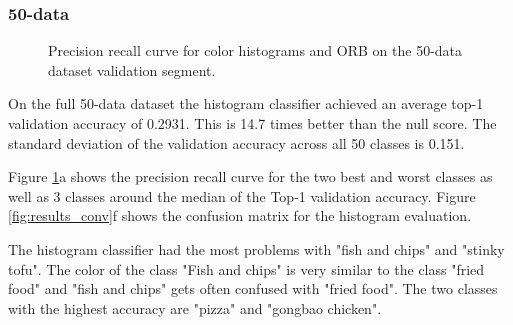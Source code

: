 \subsubsection*{50-data}
\begin{figure}[htbp]
	\centering
	\caption{Precision recall curve for color histograms and ORB on the 50-data dataset validation segment.}
	\label{fig:results_HISTORBroc}
\end{figure}

On the full 50-data dataset the histogram classifier achieved an average top-1 validation accuracy of 0.2931. This is 14.7 times better than the null score. The standard deviation of the validation accuracy across all 50 classes is 0.151.

Figure \ref{fig:results_HISTORBroc}a shows the precision recall curve for the two best and worst classes as well as 3 classes around the median of the Top-1 validation accuracy. Figure \ref{fig:results_conv}f shows the confusion matrix for the histogram evaluation.

The histogram classifier had the most problems with "fish and chips" and "stinky tofu". The color of the class "Fish and chips" is very similar to the class "fried food" and "fish and chips" gets often confused with "fried food".
The two classes with the highest accuracy are "pizza" and "gongbao chicken".

